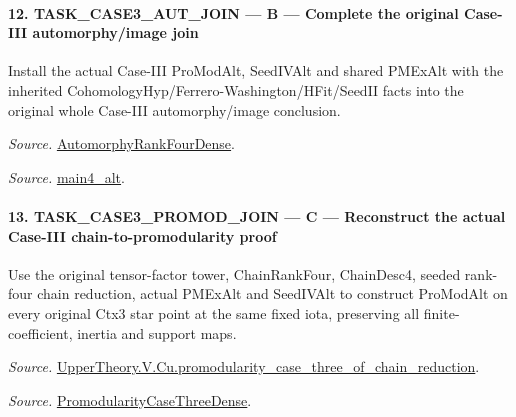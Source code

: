 \documentclass[11pt,a4paper]{article}
\numberwithin{equation}{section}
\theoremstyle{remark}\newtheorem{remark}[theorem]{Remark}
\begin{document}
\paragraph{12. TASK\_\allowbreak CASE3\_\allowbreak AUT\_\allowbreak JOIN — B — Complete the original Case-III automorphy/image join}

Install the actual Case-III ProModAlt, SeedIVAlt and shared PMExAlt with the inherited CohomologyHyp/Ferrero-Washington/HFit/SeedII facts into the original whole Case-III automorphy/image conclusion.

\emph{Source.} \href{https://github.com/CocoSgt/riemann-hypothesis-lean/blob/7cbf7a0c32fca1badf05931879a37c3f8a2b03b4/src/Development/AutomorphicArithmetic/AutomorphicVarieties/ModularityArgument/ThresholdArguments/DenseThresholdCases/PromodularityCaseThree.lean#L43-L44}{AutomorphyRankFourDense}.

\emph{Source.} \href{https://github.com/CocoSgt/riemann-hypothesis-lean/blob/7cbf7a0c32fca1badf05931879a37c3f8a2b03b4/src/Development/AutomorphicArithmetic/AutomorphicVarieties/ModularityArgument/ThresholdArguments/DenseThresholdCases/CuFinal.lean#L44-L44}{main4\_\allowbreak alt}.



\paragraph{13. TASK\_\allowbreak CASE3\_\allowbreak PROMOD\_\allowbreak JOIN — C — Reconstruct the actual Case-III chain-to-promodularity proof}

Use the original tensor-factor tower, ChainRankFour, ChainDesc4, seeded rank-four chain reduction, actual PMExAlt and SeedIVAlt to construct ProModAlt on every original Ctx3 star point at the same fixed iota, preserving all finite-coefficient, inertia and support maps.

\emph{Source.} \href{https://github.com/CocoSgt/riemann-hypothesis-lean/blob/7cbf7a0c32fca1badf05931879a37c3f8a2b03b4/src/Development/AutomorphicArithmetic/AutomorphicVarieties/ModularityArgument/ThresholdArguments/DenseThresholdCases/PromodularityCaseThreeOfLemmas.lean#L131-L153}{UpperTheory.V.Cu.promodularity\_\allowbreak case\_\allowbreak three\_\allowbreak of\_\allowbreak chain\_\allowbreak reduction}.

\emph{Source.} \href{https://github.com/CocoSgt/riemann-hypothesis-lean/blob/7cbf7a0c32fca1badf05931879a37c3f8a2b03b4/src/Development/AutomorphicArithmetic/AutomorphicVarieties/ModularityArgument/ThresholdArguments/DenseThresholdCases/PromodularityCaseThree.lean#L40-L42}{PromodularityCaseThreeDense}.
\end{document}
